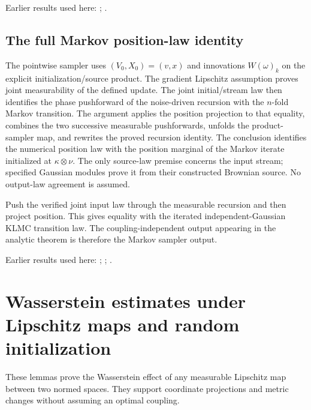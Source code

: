 \documentclass[11pt,a4paper]{report}
\begin{document}
Earlier results used here: \cite[Section~3.20.1]{LangevinLean2026ULASC}; \cite[Section~3.20.3]{LangevinLean2026ULASC}.
\subsection{\texorpdfstring{The full Markov position-law identity}{The full Markov position-law identity}}
\label{report-step-KineticLangevin-ProductMarkovLaw-lean-3}


The pointwise sampler uses \((V_0,X_0)=(v,x)\) and innovations \(W(\omega)_k\) on the explicit initialization/\allowbreak{}source product. The gradient Lipschitz assumption proves joint measurability of the defined update. The joint initial/\allowbreak{}stream law then identifies the phase pushforward of the noise-driven recursion with the \(n\)-fold Markov transition. The argument applies the position projection to that equality, combines the two successive measurable pushforwards, unfolds the product-sampler map, and rewrites the proved recursion identity. The conclusion identifies the numerical position law with the position marginal of the Markov iterate initialized at \(\kappa\otimes\nu\). The only source-law premise concerns the input stream; specified Gaussian modules prove it from their constructed Brownian source. No output-law agreement is assumed.



Push the verified joint input law through the measurable recursion and then project position. This gives equality with the iterated independent-Gaussian KLMC transition law. The coupling-independent output appearing in the analytic theorem is therefore the Markov sampler output.



Earlier results used here: \cite[Section~3.20.1]{LangevinLean2026ULASC}; \cite[Section~3.20.4]{LangevinLean2026ULASC}; \cite[Section~3.33.6]{LangevinLean2026ULASC}.
\section{\texorpdfstring{Wasserstein estimates under Lipschitz maps and random initialization}{Wasserstein estimates under Lipschitz maps and random initialization}}
\label{proof-module-KineticLangevin-TransportMap-lean}


These lemmas prove the Wasserstein effect of any measurable Lipschitz map between two normed spaces. They support coordinate projections and metric changes without assuming an optimal coupling.
\end{document}

